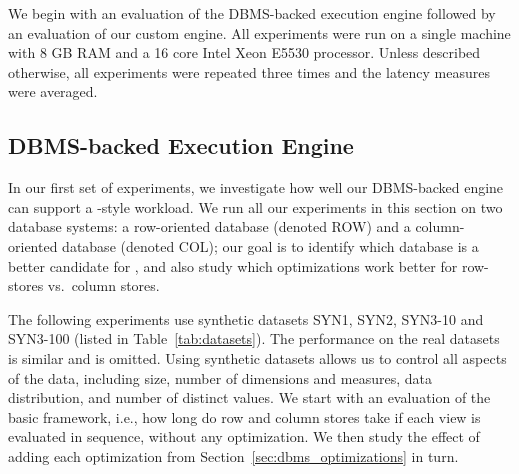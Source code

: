\squishend
We begin with an evaluation of the DBMS-backed execution engine followed by an
evaluation of our custom engine. All experiments were run on a 
single machine with 8 GB RAM and a 16 core Intel Xeon E5530 processor. 
Unless described otherwise, all experiments were 
repeated three times and the latency measures were
averaged.

\subsection{DBMS-backed Execution Engine}
\label{sec:expts_dbms_execution_engine}

In our first set of experiments, we investigate 
how well our DBMS-backed engine
can support a \VizRecDB-style workload.
We run all our experiments in this section on two database systems: a
row-oriented database (denoted ROW) and a
column-oriented database (denoted COL);
our goal is to identify which database is a better
candidate for \VizRecDB, and also study which optimizations
work better for row-stores vs.~column stores. 

The following experiments use synthetic datasets SYN1, SYN2, SYN3-10 and
SYN3-100 (listed in Table~\ref{tab:datasets}).
The performance on the real datasets is similar and is omitted.
Using synthetic datasets allows us to control all aspects
of the data, including size, number of dimensions and measures, 
data distribution, and number of distinct values. 
We start with an evaluation of the basic framework, i.e., 
how long do row and column stores take if each view is evaluated 
in sequence, without any optimization. 
We then study the effect of adding each optimization from Section~\ref{sec:dbms_optimizations} 
in turn.


